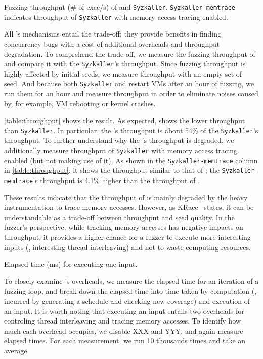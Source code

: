 
\dr{}


%
\begin{table}[t]
  \small
  \centering
  
  \caption{Fuzzing throughput (\# of exec/s) of \sys and
    \texttt{Syzkaller}. \texttt{Syzkaller-memtrace} indicates
    throughput of \texttt{Syzkaller} with memory access tracing
    enabled.}
  \label{table:throughput}
\end{table}
%
All \sys's mechanisms entail the trade-off; they provide benefits in
finding concurrency bugs with a cost of additional overheads and
throughput degradation.
%
To comprehend the trade-off, we measure the fuzzing throughput of \sys
and compare it with the \texttt{Syzkaller}'s throughput.
%
Since fuzzing throughput is highly affected by initial seeds, we
measure throughput with an empty set of seed. And because both
\texttt{Syzkaller} and \sys restart VMs after an hour of fuzzing, we
run them for an hour and measure throughput in order to eliminate
noises caused by, for example, VM rebooting or kernel crashes.

\autoref{table:throughput} shows the result. As expected, \sys shows
the lower throughput than \texttt{Syzkaller}. In particular, the
\sys's throughput is about 54\% of the \texttt{Syzkaller}'s
throughput.
%
To further understand why the \sys's throughput is degraded, we
additionally measure throughput of \texttt{Syzkaller} with memory
access tracing enabled (but not making use of it).
%
As shown in the \texttt{Syzkaller-memtrace} column in
\autoref{table:throughput}, it shows the throughput similar to that of
\sys; the \texttt{Syzkaller-memtrace}'s throughput is 4.1\% higher
than the throughput of \sys.

These results indicate that the throughput of \sys is mainly degraded
by the heavy instrumentation to trace memory accesses.
%
However, as KRace~\cite{krace} states, it can be understandable as a
trade-off between throughput and seed quality.
%
In the fuzzer's perspective, while tracking memory accesses has
negative impacts on throughput, it provides a higher chance for a
fuzzer to execute more interesting inputs (\ie, interesting thread
interleaving) and not to waste computing resources.




%
\begin{table}[t]
  \centering
  
  \caption{ Elapsed time (ms) for executing one input.}
  \label{table:elapsedtime}
\end{table}
%
%
To closely examine \sys's overheads, we measure the elapsed time for
an iteration of a fuzzing loop, and break down the elapsed time into
time taken by computation (\ie, incurred by generating a schedule and
checking new coverage) and execution of an input.
%
It is worth noting that executing an input entails two overheads for
controling thread interleaving and tracing memory accesses. To
identify how much each overhead occupies, we disable XXX and YYY, and
again measure elapsed times.
%
For each measurement, we run 10 thousands times and take an average.

